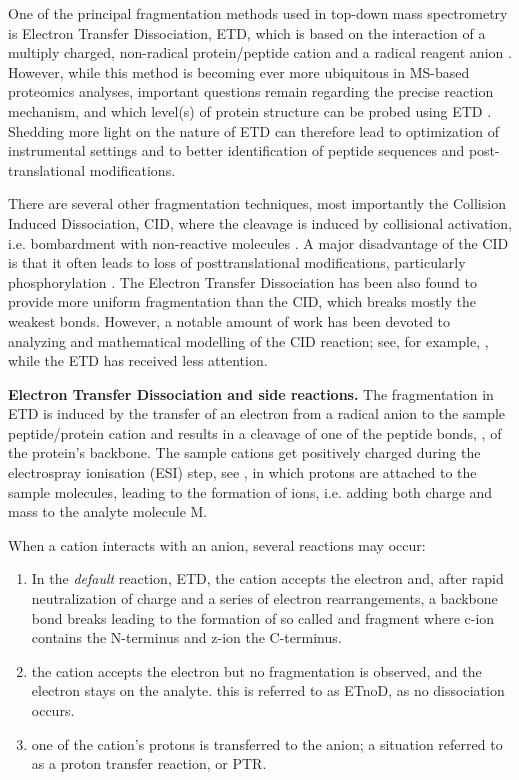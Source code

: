 \documentclass{llncs}
\begin{document}
        One of the principal fragmentation methods used in top-down mass spectrometry is Electron Transfer Dissociation, ETD, which is based on the interaction of a multiply charged, non-radical protein/peptide cation and a radical reagent anion \cite{Syka2004-rg,Zhurov2013-ua}. However, while this method is becoming ever more ubiquitous in MS-based proteomics analyses, important questions remain regarding the precise reaction mechanism, and which level(s) of protein structure can be probed using ETD \cite{Sohn2009-zv,Sohn2015-rp}. Shedding more light on the nature of ETD can therefore lead to optimization of instrumental settings and to better identification of peptide sequences and post-translational modifications.

        There are several other fragmentation techniques, most importantly the Collision Induced Dissociation, CID, where the cleavage is induced by collisional activation, i.e. bombardment with non-reactive molecules \cite{Mitchell_Wells2005-gn}. A major disadvantage of the CID is that it often leads to loss of posttranslational modifications, particularly phosphorylation \cite{Kim2012-yz}. The Electron Transfer Dissociation has been also found to provide more uniform fragmentation than the CID, which breaks mostly the weakest bonds\cite{Kim2012-yz,Zhurov2013-ls}. However, a notable amount of work has been devoted to analyzing and mathematical modelling of the CID reaction; see, for example, \cite{Zhang2004-fp,Zhang2005-jn,Wysocki2000-am}, while the ETD has received less attention.

\textbf{Electron Transfer Dissociation and side reactions.}
        The fragmentation in ETD is induced by the transfer of an electron from a radical anion to the sample peptide/protein cation and results in a cleavage of one of the peptide bonds, , of the protein’s backbone. The sample cations get positively charged during the electrospray ionisation (ESI) step, see \cite{Fenn1989-mp}, in which protons are attached to the sample molecules, leading to the formation of  ions, i.e. adding both charge and mass to the analyte molecule M.

        When a cation interacts with an anion, several reactions may occur:

        \begin{enumerate}
                \item In the \textit{default} reaction, ETD, the cation accepts the electron and, after rapid neutralization of charge and a series of electron rearrangements, a backbone  bond breaks leading to the formation of so called  and  fragment where c-ion contains the N-terminus and z-ion the C-terminus.

                \item the cation accepts the electron but no fragmentation is observed, and the electron stays on the analyte. this is referred to as ETnoD, as no dissociation occurs.

                \item one of the cation’s protons is transferred to the anion; a situation referred to as a proton transfer reaction, or PTR.
        \end{enumerate}
\end{document}
